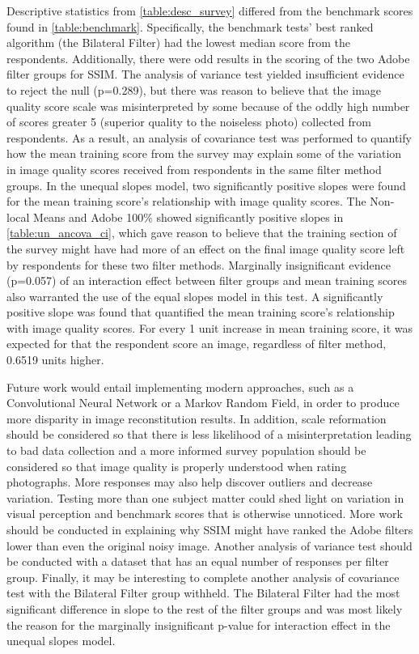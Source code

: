 \documentclass{ncjms}
\begin{document}
Descriptive statistics from \autoref{table:desc_survey} differed from the benchmark scores found in \autoref{table:benchmark}. Specifically, the benchmark tests' best ranked algorithm (the Bilateral Filter) had the lowest median score from the respondents. Additionally, there were odd results in the scoring of the two Adobe filter groups for SSIM. The analysis of variance test yielded insufficient evidence to reject the null (p=0.289), but there was reason to believe that the image quality score scale was misinterpreted by some because of the oddly high number of scores greater 5 (superior quality to the noiseless photo) collected from respondents. As a result, an analysis of covariance test was performed to quantify how the mean training score from the survey may explain some of the variation in image quality scores received from respondents in the same filter method groups. In the unequal slopes model, two significantly positive slopes were found for the mean training score's relationship with image quality scores. The Non-local Means and Adobe 100\% showed significantly positive slopes in \autoref{table:un_ancova_ci}, which gave reason to believe that the training section of the survey might have had more of an effect on the final image quality score left by respondents for these two filter methods. Marginally insignificant evidence (p=0.057) of an interaction effect between filter groups and mean training scores also warranted the use of the equal slopes model in this test. A significantly positive slope was found that quantified the mean training score's relationship with image quality scores. For every 1 unit increase in mean training score, it was expected for that the respondent score an image, regardless of filter method, 0.6519 units higher.

Future work would entail implementing modern approaches, such as a Convolutional Neural Network or a Markov Random Field, in order to produce more disparity in image reconstitution results. In addition, scale reformation should be considered so that there is less likelihood of a misinterpretation leading to bad data collection and a more informed survey population should be considered so that image quality is properly understood when rating photographs. More responses may also help discover outliers and decrease variation. Testing more than one subject matter could shed light on variation in visual perception and benchmark scores that is otherwise unnoticed. More work should be conducted in explaining why SSIM might have ranked the Adobe filters lower than even the original noisy image. Another analysis of variance test should be conducted with a dataset that has an equal number of responses per filter group. Finally, it may be interesting to complete another analysis of covariance test with the Bilateral Filter group withheld. The Bilateral Filter had the most significant difference in slope to the rest of the filter groups and was most likely the reason for the marginally insignificant p-value for interaction effect in the unequal slopes model.



\end{document}
